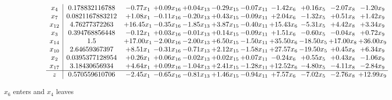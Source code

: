 \documentclass[9pt]{article}
\begin{document}
 \[\begin{array}{c| c c@{\hskip 2pt} c@{\hskip 2pt} c@{\hskip 2pt} c@{\hskip 2pt} c@{\hskip 2pt} c@{\hskip 2pt} c@{\hskip 2pt} c@{\hskip 2pt} c@{\hskip 2pt} }
 x_{4}   &  0.178832116788 & -0.77 x_{1} & +  0.09 x_{16} & +  0.04 x_{13} & -0.29 x_{15} & -0.07 x_{11} & -1.42 x_{6} & +  0.16 x_{5} & -2.07 x_{8} & -1.20 x_{9}\\
 x_{7}   &  0.0821167883212 & +  1.08 x_{1} & -0.11 x_{16} & -0.20 x_{13} & +  0.43 x_{15} & -0.09 x_{11} & +  2.04 x_{6} & -1.32 x_{5} & +  0.51 x_{8} & +  1.42 x_{9}\\
 x_{12}   &  4.76277372263 & + 16.45 x_{1} & -0.35 x_{16} & -1.85 x_{13} & +  3.87 x_{15} & -0.40 x_{11} & + 15.43 x_{6} & -5.31 x_{5} & +  4.42 x_{8} & +  3.34 x_{9}\\
 x_{3}   &  0.394768856448 & -0.12 x_{1} & +  0.03 x_{16} & -0.01 x_{13} & +  0.14 x_{15} & -0.09 x_{11} & +  1.51 x_{6} & -0.60 x_{5} & -0.04 x_{8} & +  0.72 x_{9}\\
 x_{14}   &  1.5 & + 17.00 x_{1} & -2.00 x_{16} & -2.00 x_{13} & +  6.50 x_{15} & -1.50 x_{11} & + 35.50 x_{6} & -18.50 x_{5} & + 17.00 x_{8} & + 36.00 x_{9}\\
 x_{10}   &  2.64659367397 & +  8.51 x_{1} & -0.31 x_{16} & -0.71 x_{13} & +  2.12 x_{15} & -1.58 x_{11} & + 27.57 x_{6} & -19.50 x_{5} & +  0.45 x_{8} & +  6.34 x_{9}\\
 x_{2}   &  0.0395377128954 & +  0.26 x_{1} & +  0.06 x_{16} & -0.02 x_{13} & +  0.02 x_{15} & +  0.07 x_{11} & -0.24 x_{6} & +  0.55 x_{5} & +  0.43 x_{8} & -1.06 x_{9}\\
 x_{17}   &  3.18430656934 & +  4.64 x_{1} & +  0.09 x_{16} & -1.04 x_{13} & +  2.41 x_{15} & -1.28 x_{11} & + 12.52 x_{6} & -4.80 x_{5} & -4.11 x_{8} & -2.84 x_{9}\\
\hline
z    &  0.570559610706 & -2.45 x_{1} & -0.65 x_{16} & -0.81 x_{13} & +  1.46 x_{15} & -0.94 x_{11} & +  7.57 x_{6} & -7.02 x_{5} & -2.76 x_{8} & + 12.99 x_{9}\\
\end{array}\]


 $ x_{6} $ enters and $ x_{4} $ leaves 
\end{document}
